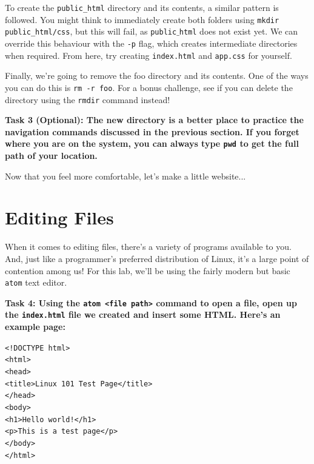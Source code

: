 \documentclass[a4paper,11pt,parskip=half-]{scrartcl}
\begin{document}
To create the \texttt{public\_html} directory and its contents, a similar pattern is followed. 
You might think to immediately create both folders using \texttt{mkdir public\_html/css}, but this will fail, as \texttt{public$\_$html} does not exist yet. 
We can override this behaviour with the \texttt{-p} flag, which creates intermediate directories when required. 
From here, try creating \texttt{index.html} and \texttt{app.css} for yourself.

Finally, we’re going to remove the foo directory and its contents. 
One of the ways you can do this is \texttt{rm -r foo}. 
For a bonus challenge, see if you can delete the directory using the \texttt{rmdir} command instead!

\bfseries Task 3 (Optional): \normalfont 
The new directory is a better place to practice the navigation commands discussed in the previous section. 
If you forget where you are on the system, you can always type \texttt{pwd} to get the full path of your location. 

Now that you feel more comfortable, let's make a little website...

\newpage

\section*{Editing Files}

When it comes to editing files, there's a variety of programs available to you. 
And, just like a programmer's preferred distribution of Linux, it's a large point of contention among us! 
For this lab, we'll be using the fairly modern but basic \texttt{atom} text editor.

\bfseries Task 4: \normalfont 
Using the \texttt{atom <file path>} command to open a file, open up the \texttt{index.html} file we created and insert some HTML. 
Here's an example page:

\qquad \texttt{<!DOCTYPE html>} \\
\qquad \texttt{<html>} \\
\qquad \qquad \texttt{<head>} \\
\qquad \qquad \qquad \texttt{<title>Linux 101 Test Page</title>} \\
\qquad \qquad \texttt{</head>} \\
\qquad \qquad \texttt{<body>} \\
\qquad \qquad \qquad \texttt{<h1>Hello world!</h1>} \\
\qquad \qquad \qquad \texttt{<p>This is a test page</p>} \\
\qquad \qquad \texttt{</body>} \\
\qquad \texttt{</html>}
\end{document}
